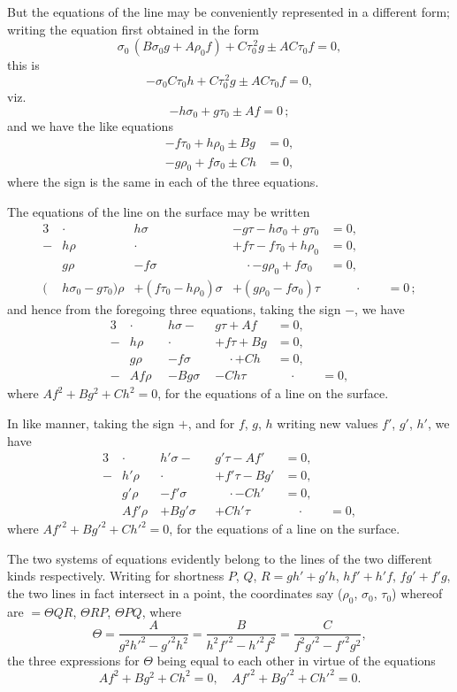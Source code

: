 \documentclass[11pt,a4paper]{book}
\begin{document}
But the equations of the line may be conveniently represented in a different form; writing the equation first obtained in the form
\[ \sigma_0\,(B\sigma_0 g + A\rho_0 f) + C\tau_0^{\,2} g \pm AC\tau_0 f = 0, \]
this is
\[ -\sigma_0 C\tau_0 h + C\tau_0^{\,2} g \pm AC\tau_0 f = 0, \]
viz.
\[ -h\sigma_0 + g\tau_0 \pm Af = 0\,; \]
and we have the like equations
\begin{align*}
-f\tau_0 + h\rho_0 \pm Bg &= 0, \\
-g\rho_0 + f\sigma_0 \pm Ch &= 0,
\end{align*}
where the sign is the same in each of the three equations.

The equations of the line on the surface may be written
\begin{alignat*}{3}
&\cdot\qquad & h\sigma &- g\tau - h\sigma_0 + g\tau_0 &= 0, \\
-&h\rho &\cdot\qquad & + f\tau - f\tau_0 + h\rho_0 &= 0, \\
&g\rho & - f\sigma &\quad\cdot - g\rho_0 + f\sigma_0 &= 0, \\
(&h\sigma_0-g\tau_0)\rho &+ (f\tau_0-h\rho_0)\sigma &+ (g\rho_0-f\sigma_0)\tau &\qquad\cdot\qquad = 0\,;
\end{alignat*}
and hence from the foregoing three equations, taking the sign $-$, we have
\begin{alignat*}{3}
&\cdot\qquad & h\sigma -\phantom{g}\, &g\tau + Af &= 0, \\
-&h\rho &\cdot\qquad & + f\tau + Bg &= 0, \\
&g\rho & - f\sigma &\quad\cdot + Ch &= 0, \\
-&Af\rho & - Bg\sigma & - Ch\tau &\quad\cdot\qquad = 0,
\end{alignat*}
where $Af^2 + Bg^2 + Ch^2 = 0$, for the equations of a line on the surface.

In like manner, taking the sign $+$, and for $f$, $g$, $h$ writing new values $f'$, $g'$, $h'$, we have
\begin{alignat*}{3}
&\cdot\qquad & h'\sigma -\phantom{g'}\, &g'\tau - Af' &= 0, \\
-&h'\rho &\cdot\qquad & + f'\tau - Bg' &= 0, \\
&g'\rho & - f'\sigma &\quad\cdot - Ch' &= 0, \\
&Af'\rho & + Bg'\sigma & + Ch'\tau &\quad\cdot\qquad = 0,
\end{alignat*}
where $Af'^2 + Bg'^2 + Ch'^2 = 0$, for the equations of a line on the surface.

The two systems of equations evidently belong to the lines of the two different kinds respectively. Writing for shortness $P$, $Q$, $R = gh' + g'h$, $hf' + h'f$, $fg' + f'g$, the two lines in fact intersect in a point, the coordinates say ($\rho_0$, $\sigma_0$, $\tau_0$) whereof are $= \Theta QR$, $\Theta RP$, $\Theta PQ$, where
\[ \Theta = \frac{A}{g^2h'^2 - g'^2h^2} = \frac{B}{h^2f'^2 - h'^2f^2} = \frac{C}{f^2g'^2 - f'^2g^2}, \]
the three expressions for $\Theta$ being equal to each other in virtue of the equations
\[ Af^2 + Bg^2 + Ch^2 = 0,\quad Af'^2 + Bg'^2 + Ch'^2 = 0. \]
\end{document}
